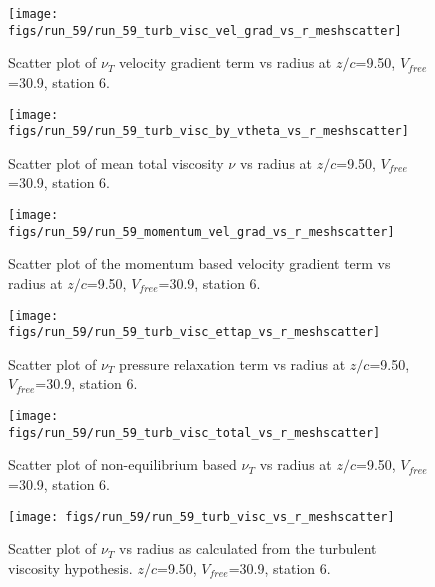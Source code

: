 \begin{figure}[H]
\centering
\texttt{[image: figs/run\_59/run\_59\_turb\_visc\_vel\_grad\_vs\_r\_meshscatter]}
\caption{Scatter plot of $\nu_T$ velocity gradient term vs radius at $z/c$=9.50, $V_{free}$=30.9, station 6.}
\end{figure}


\begin{figure}[H]
\centering
\texttt{[image: figs/run\_59/run\_59\_turb\_visc\_by\_vtheta\_vs\_r\_meshscatter]}
\caption{Scatter plot of mean total viscosity $\nu$ vs radius at $z/c$=9.50, $V_{free}$=30.9, station 6.}
\end{figure}


\begin{figure}[H]
\centering
\texttt{[image: figs/run\_59/run\_59\_momentum\_vel\_grad\_vs\_r\_meshscatter]}
\caption{Scatter plot of the momentum based velocity gradient term vs radius at $z/c$=9.50, $V_{free}$=30.9, station 6.}
\end{figure}


\begin{figure}[H]
\centering
\texttt{[image: figs/run\_59/run\_59\_turb\_visc\_ettap\_vs\_r\_meshscatter]}
\caption{Scatter plot of $\nu_T$ pressure relaxation term vs radius at $z/c$=9.50, $V_{free}$=30.9, station 6.}
\end{figure}


\begin{figure}[H]
\centering
\texttt{[image: figs/run\_59/run\_59\_turb\_visc\_total\_vs\_r\_meshscatter]}
\caption{Scatter plot of non-equilibrium based $\nu_T$ vs radius at $z/c$=9.50, $V_{free}$=30.9, station 6.}
\end{figure}


\begin{figure}[H]
\centering
\texttt{[image: figs/run\_59/run\_59\_turb\_visc\_vs\_r\_meshscatter]}
\caption{Scatter plot of $\nu_T$ vs radius as calculated from the turbulent viscosity hypothesis. $z/c$=9.50, $V_{free}$=30.9, station 6.}
\end{figure}


